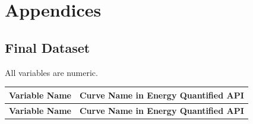 \section*{Appendices}
\appendix
\renewcommand\thesubsection{\Alph{subsection}}
\setcounter{subsection}{0}
\setupappendixheaders

\thispagestyle{plain}
\subsection{Final Dataset}
\label{apdx:final-dataset}

All variables are numeric.

\begin{xltabular}{\textwidth}{lX}
    \textbf{Variable Name}                               & \textbf{Curve Name in Energy Quantified API}                    \\ 
    \endfirsthead

    \textbf{Variable Name}                               & \textbf{Curve Name in Energy Quantified API}                    \\ 
    \endhead


\end{xltabular}
